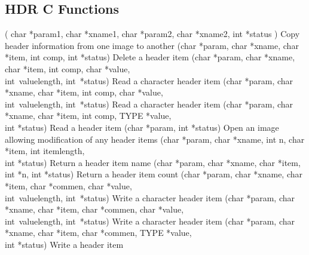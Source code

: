 \documentclass[twoside,11pt]{article}
\newenvironment{latexonly}{}{}
\renewcommand{\_}{\texttt{\symbol{95}}}
\begin{document}
\subsection{HDR C Functions}
\begin{latexonly}
{\small
\begin{description}
     {( char *param1, char *xname1, char *param2, char *xname2, int *status )}
     {Copy header information from one image to another}
     {(char *param, char *xname, char *item, int comp, int *status)}
     {Delete a header item}
     {(char *param, char *xname, char *item, int comp, char *value,
       \\ \hspace*{3em} int~value\_length, int~*status)}
     {Read a character header item}
     {(char *param, char *xname, char *item, int comp, char *value,
       \\ \hspace*{3em} int~value\_length, int~*status)}
     {Read a character header item}
     {(char *param, char *xname, char *item, int comp, TYPE *value,
       \\ \hspace*{3em} int *status)}
     {Read a header item}
     {(char *param, int *status)}
     {Open an image allowing modification of any header items}
     {(char *param, char *xname, int n, char *item, int item\_length,
       \\ \hspace*{3em} int *status)}
     {Return a header item name}
     {(char *param, char *xname, char *item, int *n, int *status)}
     {Return a header item count}
     {(char *param, char *xname, char *item, char *commen,
       char *value, \\ \hspace*{3em} int~value\_length, int~*status)}
     {Write a character header item}
     {(char *param, char *xname, char *item, char *commen,
       char *value, \\ \hspace*{3em} int~value\_length, int~*status)}
     {Write a character header item}
     {(char *param, char *xname, char *item, char *commen,
       TYPE *value, \\ \hspace*{3em} int *status)}
     {Write a header item}
\end{description}
}
\end{latexonly}
\end{document}
